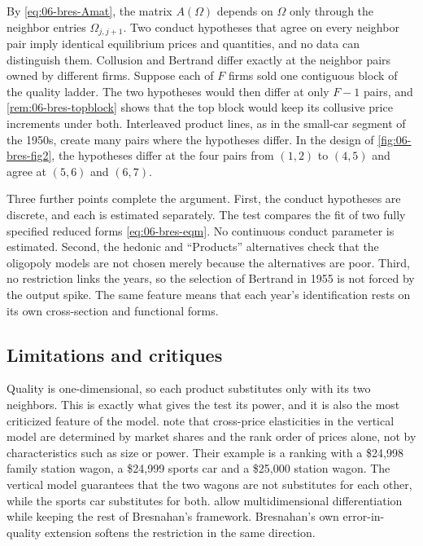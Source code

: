 \begin{remark}\label{rem:06-bres-power}
By \eqref{eq:06-bres-Amat}, the matrix $A(\Omega)$ depends on $\Omega$ only through the neighbor entries
$\Omega_{j,j+1}$. Two conduct hypotheses that agree on every neighbor pair imply identical equilibrium prices and
quantities, and no data can distinguish them. Collusion and Bertrand differ exactly at the neighbor pairs owned by
different firms. Suppose each of $F$ firms sold one contiguous block of the quality ladder. The two hypotheses would then
differ at only $F - 1$ pairs, and \cref{rem:06-bres-topblock} shows that the top block would keep its collusive
price increments under both.
Interleaved product lines, as in the small-car segment of the 1950s, create many pairs where the hypotheses differ.
In the design of \cref{fig:06-bres-fig2}, the hypotheses differ at the four pairs from $(1,2)$ to $(4,5)$ and agree at
$(5,6)$ and $(6,7)$.
\end{remark}

Three further points complete the argument. First, the conduct hypotheses are discrete, and each is estimated
separately. The test compares the fit of two fully specified reduced forms \eqref{eq:06-bres-eqm}. No
continuous conduct parameter is estimated. Second, the hedonic and ``Products'' alternatives check that the oligopoly models
are not chosen merely because the alternatives are poor. Third, no restriction links the years, so the selection of
Bertrand in 1955 is not forced by the output spike. The same feature means that each year's identification rests on
its own cross-section and functional forms.

\subsection{Limitations and critiques}\label{sec:06-bres-limits}

Quality is one-dimensional, so each product substitutes only with its two neighbors. This is exactly what gives the
test its power, and it is also the most criticized feature of the model. \citet[p.~852]{BerryLevinsohnPakes1995}
note that cross-price elasticities in the vertical model are determined by market shares and the rank order of
prices alone, not by characteristics such as size or power. Their example is a ranking with a \$24,998 family
station wagon, a \$24,999 sports car and a \$25,000 station wagon. The vertical model guarantees that the two wagons
are not substitutes for each other, while the sports car substitutes for both. \citet{FeenstraLevinsohn1995} allow
multidimensional differentiation while keeping the rest of Bresnahan's framework. Bresnahan's own error-in-quality
extension softens the restriction in the same direction.

